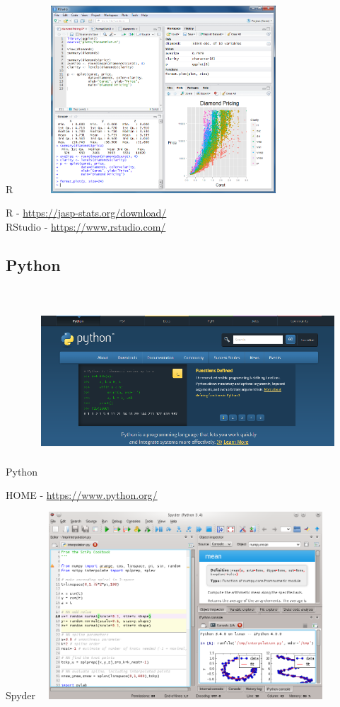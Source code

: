 \documentclass{beamer}
\begin{document}
\begin{frame}{R}
\centering 
\includegraphics[height=7cm, width=11cm]{r}

R - \url{https://jasp-stats.org/download/} \\ \vspace{0.5cm}
RStudio - \url{https://www.rstudio.com/}

\end{frame}

\subsection{Python}

\begin{frame}{Python}
\centering 
\includegraphics[height=7cm, width=11cm]{python}

HOME - \url{https://www.python.org/} 
\end{frame}

\begin{frame}{Spyder}
\centering 
\includegraphics[height=7cm, width=11cm]{spyder}
\end{frame}
\end{document}

